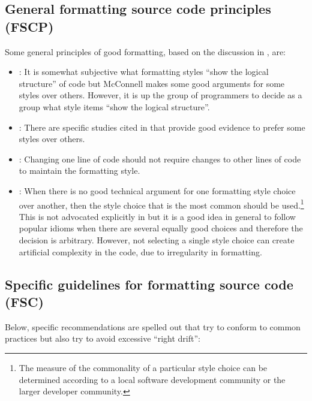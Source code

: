 %
\subsection{General formatting source code principles (FSCP)}
%

Some general principles of good formatting, based on the discussion in
\cite[Section 31.1]{CodeComplete2nd04}, are:

\begin{itemize}

\item\FSCPShowLogicalStructure: It is somewhat subjective what
  formatting styles ``show the logical structure'' of code but
  McConnell makes some good arguments for some styles over others.
  However, it is up the group of programmers to decide as a group what
  style items ``show the logical structure''.

\item\FSCPImproveReadability: There are specific studies cited in
  \cite[Chapter 31]{CodeComplete2nd04} that provide good evidence to
  prefer some styles over others.

\item\FSCPRetainFormatting: Changing one line of code should not
  require changes to other lines of code to maintain the formatting
  style.

\item\FSCPFollowCommonIdioms: When there is no good technical argument
  for one formatting style choice over another, then the style choice
  that is the most common should be used.\footnote{The measure of the
    commonality of a particular style choice can be determined
    according to a local software development community or the larger
    developer community.}  This is not advocated explicitly in
  \cite[Chapter 31]{CodeComplete2nd04} but it is a good idea in
  general to follow popular idioms when there are several equally good
  choices and therefore the decision is arbitrary.  However, not
  selecting a single style choice can create artificial complexity in
  the code, due to irregularity in formatting.

\end{itemize}


%
\subsection{Specific guidelines for formatting source code (FSC)}
%

Below, specific recommendations are spelled out that try to conform to common
practices but also try to avoid excessive ``right drift'':


